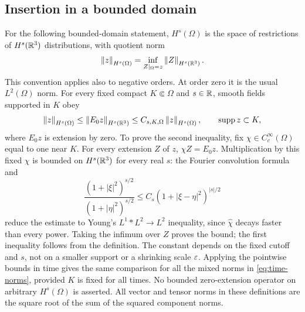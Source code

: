 \subsection{Insertion in a bounded domain}
For the following bounded-domain statement, $H^s(\Omega)$ is the space
of restrictions of $H^s(\mathbb R^3)$ distributions, with quotient norm
\begin{equation}\label{eq:restriction-norm}
 \left\lVert z\right\rVert_{H^s(\Omega)}=\inf_{Z|_\Omega=z}\left\lVert Z\right\rVert_{H^s(\mathbb R^3)}.
\end{equation}
This convention applies also to negative orders. At order zero it is the
usual $L^2(\Omega)$ norm.
For every fixed compact $K\Subset\Omega$ and $s\in\mathbb R$, smooth fields supported
in $K$ obey
\begin{equation}\label{eq:zero-extension}
 \left\lVert z\right\rVert_{H^s(\Omega)}\le\left\lVert E_0z\right\rVert_{H^s(\mathbb R^3)}
 \le C_{s,K,\Omega}\left\lVert z\right\rVert_{H^s(\Omega)},
 \qquad \operatorname{supp}z\subset K,
\end{equation}
where $E_0z$ is extension by zero. To prove the second inequality, fix
$\chi\in C_c^\infty(\Omega)$ equal to one near $K$. For every extension $Z$
of $z$, $\chi Z=E_0z$. Multiplication by this fixed $\chi$ is bounded on
$H^s(\mathbb R^3)$ for every real $s$: the Fourier convolution formula and
\[
 \frac{(1+|\xi|^2)^{s/2}}{(1+|\eta|^2)^{s/2}}
 \le C_s(1+|\xi-\eta|^2)^{|s|/2}
\]
reduce the estimate to Young's $L^1*L^2\to L^2$ inequality, since
$\widehat\chi$ decays faster than every power. Taking the infimum over $Z$
proves the bound; the first inequality follows from the definition.
The constant depends on the fixed cutoff and $s$, not on a smaller support
or a shrinking scale $\varepsilon$. Applying the pointwise bounds in time gives the
same comparison for all the mixed norms in \eqref{eq:time-norms}, provided
$K$ is fixed for all times. No bounded zero-extension operator on arbitrary
$H^s(\Omega)$ is asserted. All vector and tensor norms in these definitions
are the square root of the sum of the squared component norms.

